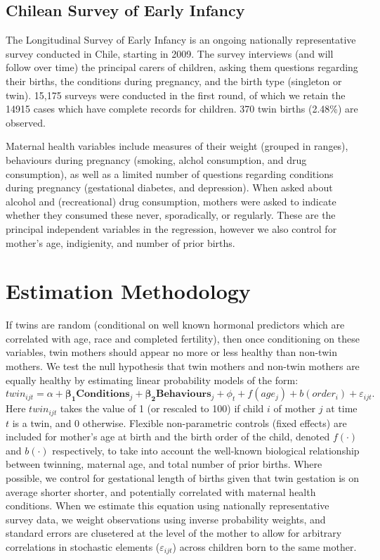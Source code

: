 \documentclass{nature}
\begin{document}
\begin{linenumbers}
\subsection{Chilean Survey of Early Infancy}
The Longitudinal Survey of Early Infancy is an ongoing nationally representative survey conducted in Chile, starting in 2009.  The survey interviews (and will follow over time) the principal carers of children, asking them questions regarding their births, the conditions during pregnancy, and the birth type (singleton or twin).  15,175 surveys were conducted in the first round, of which we retain the 14915 cases which have complete records for children.  370 twin births (2.48\%) are observed.

Maternal health variables include measures of their weight (grouped in ranges), behaviours during pregnancy (smoking, alchol consumption, and drug consumption), as well as a limited number of questions regarding conditions during pregnancy (gestational diabetes, and depression).  When asked about alcohol and (recreational) drug consumption, mothers were asked to indicate whether they consumed these never, sporadically, or regularly.  These are the principal independent variables in the regression, however we also control for mother's age, indigienity, and number of prior births.

\section{Estimation Methodology}
If twins are random (conditional on well known hormonal predictors which are correlated with age, race and completed fertility\cite{Hall2003,Hoekstraetal2008}), then once conditioning on these variables, twin mothers should appear no more or less healthy than non-twin mothers.  We test the null hypothesis that twin mothers and non-twin mothers are equally healthy by estimating linear probability models of the form:
\renewcommand\theequation{S.\arabic{equation}}  
\begin{equation}
\label{reg:twincond}
twin_{ijt}=\alpha + \bm{\beta_1} \bm{Conditions}_j + \bm{\beta_2} \bm{Behaviours}_j + \phi_t 
           + f(age_j) + b(order_i) + \varepsilon_{ijt}.
\end{equation}
Here $twin_{ijt}$ takes the value of 1 (or rescaled to 100) if child $i$ of mother $j$ at time $t$ is a twin, and 0 otherwise.  Flexible non-parametric controls (fixed effects) are included for mother's age at birth and the birth order of the child, denoted $f(\cdot)$ and $b(\cdot)$ respectively, to take into account the well-known biological relationship between twinning, maternal age, and total number of prior births.  Where possible, we control for gestational length of births given that twin gestation is on average shorter shorter, and potentially correlated with maternal health conditions\cite{Morrison2005}.  When we estimate this equation using nationally representative survey data, we weight observations using inverse probability weights, and standard errors are clusetered at the level of the mother to allow for arbitrary correlations in stochastic elements ($\varepsilon_{ijt}$) across children born to the same mother.


\end{linenumbers}
\end{document}
